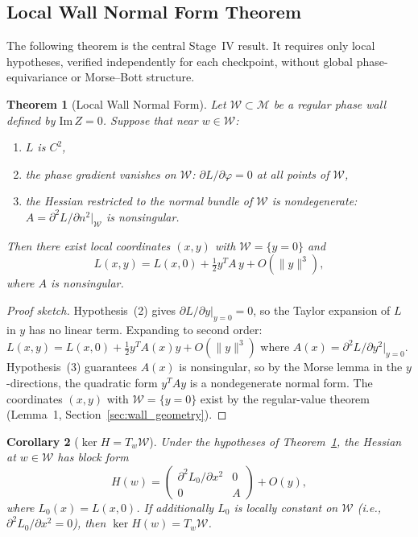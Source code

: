 \documentclass[11pt]{amsart}
\newtheorem{theorem}{Theorem}[section]
\newtheorem{corollary}[theorem]{Corollary}
\begin{document}
\subsection{Local Wall Normal Form Theorem}
\label{sec:normal_form}

The following theorem is the central Stage~IV result.
It requires only local hypotheses, verified independently for each
checkpoint, without global phase-equivariance or Morse--Bott structure.

\begin{theorem}[Local Wall Normal Form]
\label{thm:normal_form}
Let $\mathcal{W} \subset \mathcal{M}$ be a regular phase wall defined by
$\mathrm{Im}\,Z = 0$. Suppose that near $w \in \mathcal{W}$:
\begin{enumerate}
\item $L$ is $C^2$,
\item the phase gradient vanishes on $\mathcal{W}$:
  $\partial L/\partial\varphi = 0$ at all points of $\mathcal{W}$,
\item the Hessian restricted to the normal bundle of $\mathcal{W}$
  is nondegenerate: $A = \partial^2 L/\partial n^2|_{\mathcal{W}}$
  is nonsingular.
\end{enumerate}
Then there exist local coordinates $(x,y)$ with $\mathcal{W} = \{y=0\}$ and
\[
  L(x,y) = L(x,0) + \tfrac{1}{2} y^T A\, y + O(\|y\|^3),
\]
where $A$ is nonsingular.
\end{theorem}

\begin{proof}[Proof sketch]
Hypothesis~(2) gives $\partial L/\partial y|_{y=0} = 0$, so the Taylor
expansion of $L$ in $y$ has no linear term.
Expanding to second order:
$L(x,y) = L(x,0) + \tfrac{1}{2} y^T A(x) y + O(\|y\|^3)$
where $A(x) = \partial^2 L/\partial y^2|_{y=0}$.
Hypothesis~(3) guarantees $A(x)$ is nonsingular, so by the Morse lemma
in the $y$-directions, the quadratic form $y^T A y$ is a nondegenerate
normal form. The coordinates $(x,y)$ with $\mathcal{W}=\{y=0\}$
exist by the regular-value theorem (Lemma~1, Section~\ref{sec:wall_geometry}).
\end{proof}

\begin{corollary}[$\ker H = T_w \mathcal{W}$]
\label{cor:kernel}
Under the hypotheses of Theorem~\ref{thm:normal_form}, the Hessian
at $w \in \mathcal{W}$ has block form
\[
  H(w) = \begin{pmatrix} \partial^2 L_0/\partial x^2 & 0 \\ 0 & A \end{pmatrix}
  + O(y),
\]
where $L_0(x) = L(x,0)$.
If additionally $L_0$ is locally constant on $\mathcal{W}$
(i.e., $\partial^2 L_0/\partial x^2 = 0$), then
$\ker H(w) = T_w \mathcal{W}$.
\end{corollary}
\end{document}
